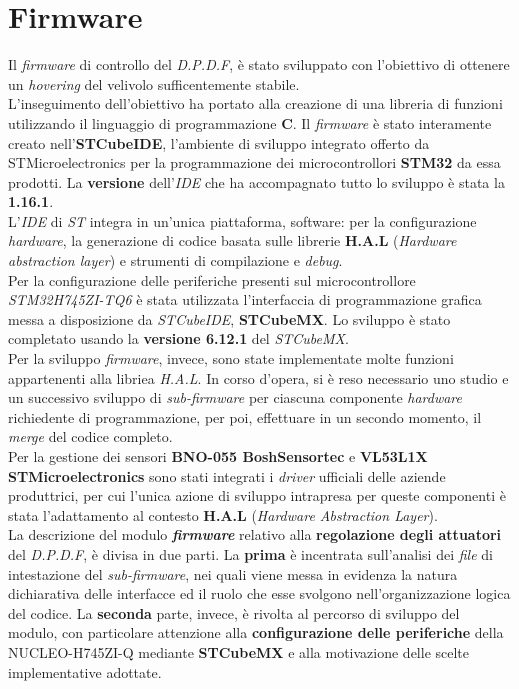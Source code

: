 \chapter{Firmware}
Il \textit{firmware} di controllo del \textit{D.P.D.F}, è stato sviluppato con l'obiettivo di ottenere un \textit{hovering} del velivolo sufficentemente stabile.\\
L'inseguimento dell'obiettivo ha portato alla creazione di una libreria di funzioni utilizzando il linguaggio di programmazione \textbf{C}. Il \textit{firmware} è stato interamente creato nell'\textbf{STCubeIDE}, l'ambiente di sviluppo integrato offerto da
STMicroelectronics per la programmazione dei microcontrollori \textbf{STM32} da essa prodotti. La \textbf{versione} dell'\textit{IDE} che ha accompagnato tutto lo sviluppo è stata la \textbf{1.16.1}.\\
L'\textit{IDE} di \textit{ST} integra in un'unica piattaforma, software: per la configurazione \textit{hardware}, la generazione di codice basata sulle librerie \textbf{H.A.L} (\textit{Hardware abstraction layer}) e strumenti di compilazione e \textit{debug}.\\
Per la configurazione delle periferiche presenti sul microcontrollore \textit{STM32H745ZI-TQ6} è stata utilizzata l'interfaccia di programmazione grafica messa a disposizione da \textit{STCubeIDE}, \textbf{STCubeMX}. Lo sviluppo è stato completato usando la \textbf{versione 6.12.1} del \textit{STCubeMX}.\\
Per la sviluppo \textit{firmware}, invece, sono state implementate molte funzioni appartenenti alla libriea \textit{H.A.L}.
In corso d'opera, si è reso necessario uno studio e un successivo sviluppo di \textit{sub-firmware} per ciascuna componente \textit{hardware} richiedente di programmazione, per poi, effettuare in un secondo momento, il \textit{merge} del codice completo.\\
Per la gestione dei sensori \textbf{BNO-055 BoshSensortec} e \textbf{VL53L1X STMicroelectronics} sono stati integrati i \textit{driver} ufficiali delle aziende produttrici, per cui l'unica azione di sviluppo intrapresa per queste componenti è stata l'adattamento al contesto \textbf{H.A.L} (\textit{Hardware Abstraction Layer}).\\
La descrizione del modulo \textbf{\textit{firmware}} relativo alla \textbf{regolazione degli attuatori} del \textit{D.P.D.F}, è divisa in due parti. La \textbf{prima} è incentrata sull'analisi dei \textit{file} di intestazione del \textit{sub-firmware}, nei quali viene messa in evidenza la natura dichiarativa delle interfacce ed il ruolo che esse svolgono
nell'organizzazione logica del codice. La \textbf{seconda} parte, invece, è rivolta al percorso di sviluppo del modulo, con particolare attenzione alla \textbf{configurazione delle periferiche} della NUCLEO-H745ZI-Q mediante \textbf{STCubeMX} e alla motivazione delle scelte implementative adottate.\\

